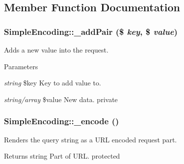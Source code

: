 \subsection{Member Function Documentation}
\hypertarget{class_simple_encoding_af08f8ed896df1fb85a2a45d676e9b5f5}{
\subsubsection[{\_\-addPair}]{\setlength{\rightskip}{0pt plus 5cm}SimpleEncoding::\_\-addPair (\$ {\em key}, \/  \$ {\em value})}}
\label{class_simple_encoding_af08f8ed896df1fb85a2a45d676e9b5f5}
Adds a new value into the request. 
\begin{DoxyParams}{Parameters}
\item[{\em string}]\$key Key to add value to. \item[{\em string/array}]\$value New data.  private \end{DoxyParams}
\hypertarget{class_simple_encoding_a934397a98be4dab7d58382d83222765b}{
\subsubsection[{\_\-encode}]{\setlength{\rightskip}{0pt plus 5cm}SimpleEncoding::\_\-encode ()}}
\label{class_simple_encoding_a934397a98be4dab7d58382d83222765b}
Renders the query string as a URL encoded request part. \begin{DoxyReturn}{Returns}
string Part of URL.  protected 
\end{DoxyReturn}


